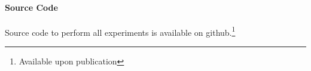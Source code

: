 \documentclass{article}
\begin{document}
\paragraph{Source Code}
Source code to perform all experiments is available on github.\footnote{Available upon publication}







\end{document}
